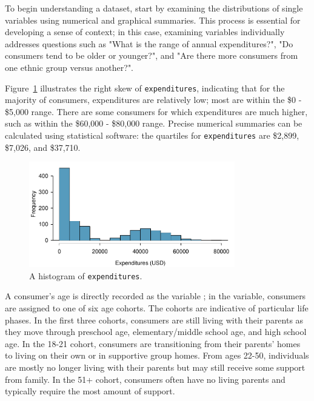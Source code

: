 To begin understanding a dataset, start by examining the distributions of single variables using numerical and graphical summaries. This process is essential for developing a sense of context; in this case, examining variables individually addresses questions such as "What is the range of annual expenditures?", "Do consumers tend to be older or younger?", and "Are there more consumers from one ethnic group versus another?". 

Figure~\ref{ddsExpHist} illustrates the right skew of \texttt{expenditures}, indicating that for the majority of consumers, expenditures are relatively low; most are within the \$0 - \$5,000 range. There are some consumers for which expenditures are much higher, such as within the \$60,000 - \$80,000 range. Precise numerical summaries can be calculated using statistical software: the quartiles for \texttt{expenditures} are \$2,899, \$7,026, and \$37,710. 

\begin{figure}[h]
	\centering
	\includegraphics[width=0.8\textwidth]{ch_intro_to_data_oi_biostat/figures/ddsExpHist/ddsExpHist}
	\caption{A histogram of \texttt{expenditures}. }
	\label{ddsExpHist}
\end{figure}


A consumer's age is directly recorded as the variable ; in the  variable, consumers are assigned to one of six age cohorts. The cohorts are indicative of particular life phases. In the first three cohorts, consumers are still living with their parents as they move through preschool age, elementary/middle school age, and high school age. In the 18-21 cohort, consumers are transitioning from their parents' homes to living on their own or in supportive group homes. From ages 22-50, individuals are mostly no longer living with their parents but may still receive some support from family. In the 51+ cohort, consumers often have no living parents and typically require the most amount of support.

